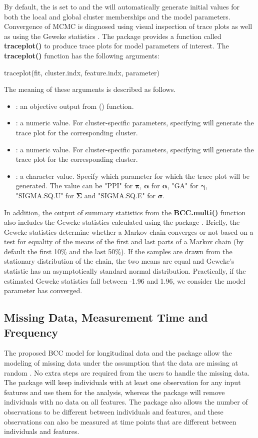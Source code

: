 By default, the  is set to  and the  will automatically generate initial values for both the local and global cluster memberships and the model parameters. 
Convergence of MCMC is diagnosed using visual inspection of trace plots as well as using the Geweke statistics \citep{Geweke1991}. The  package provides a function called \textbf{traceplot()} to produce trace plots for model parameters of interest. The \textbf{traceplot()} function has the following arguments: 
\begin{example}
traceplot(fit, cluster.indx, feature.indx, parameter)
\end{example}
The meaning of these arguments is described as follows. 
\begin{itemize}
	\item {}: an objective output from () function.  
	\item {}: a numeric value. For cluster-specific parameters, specifying  will generate the trace plot for the corresponding cluster. 
	\item {}: a numeric value. For cluster-specific parameters, specifying  will generate the trace plot for the corresponding cluster. 
	\item {}: a character value. Specify which parameter for which the trace plot will be generated. The value can be "PPI" for $\boldsymbol{\pi}$, $\boldsymbol{\alpha}$ for $\boldsymbol{\alpha}$, "GA" for $\boldsymbol{\gamma}$, "SIGMA.SQ.U" for $\boldsymbol{\Sigma}$ and "SIGMA.SQ.E" for  $\boldsymbol{\sigma}$.
\end{itemize}
In addition, the output of summary statistics from the \textbf{BCC.multi()} function also includes the Geweke statistics calculated using the  package \citep{Martyn2006}. Briefly, the Geweke statistics determine whether a Markov chain converges or not based on a test for equality of the means of the first and last parts of a Markov chain (by default the first 10\% and the last 50\%). If the samples are drawn from the stationary distribution of the chain, the two means are equal and Geweke's statistic has an asymptotically standard normal distribution. Practically, if the estimated Geweke statistics fall between -1.96 and 1.96, we consider the model parameter has converged. 
\subsection{Missing Data, Measurement Time and Frequency}
The proposed BCC model for longitudinal data and the  package allow the modeling of missing data under the assumption that the data are missing at random \citep{Lu2022, Tan2022a}. No extra steps are required from the users to handle the missing data. The package will keep individuals with at least one observation for any input features and use them for the analysis, whereas the package will remove individuals with no data on all features. The package also allows the number of observations to be different between individuals and features, and these observations can also be measured at time points that are different between individuals and features.
